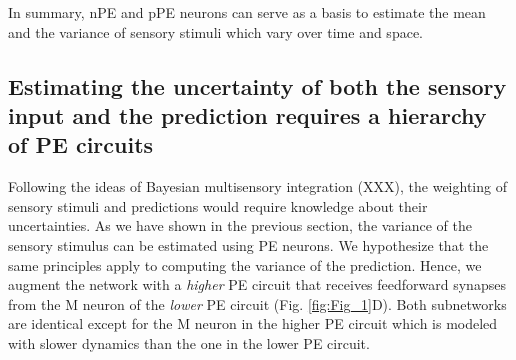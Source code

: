 \documentclass[10pt,a4paper,draft]{article}
\begin{document}
In summary, nPE and pPE neurons can serve as a basis to estimate the mean and the variance of sensory stimuli which vary over time and space.


\subsection*{Estimating the uncertainty of both the sensory input and the prediction requires a hierarchy of PE circuits}
%
Following the ideas of Bayesian multisensory integration (XXX), the weighting of sensory stimuli and predictions would require knowledge about their uncertainties. As we have shown in the previous section, the variance of the sensory stimulus can be estimated using PE neurons. We hypothesize that the same principles apply to computing the variance of the prediction. Hence, we augment the network with a \textit{higher} PE circuit that receives feedforward synapses from the M neuron of the \textit{lower} PE circuit (Fig. \ref{fig:Fig_1}D). Both subnetworks are identical except for the M neuron in the higher PE circuit which is modeled with slower dynamics than the one in the lower PE circuit.
%
\end{document}
